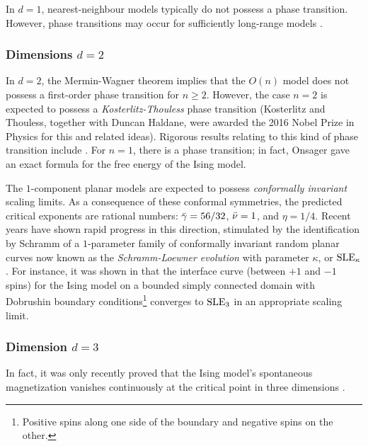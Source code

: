 In $d = 1$, nearest-neighbour models typically do not possess a phase transition.
However, phase transitions may occur for sufficiently long-range models \cite{Dyso69}.

\subsubsection{Dimensions $d = 2$}

In $d = 2$, the Mermin-Wagner theorem \cite{MW66} implies that the $O(n)$ model does
not possess a first-order phase transition for $n \ge 2$. However, the case $n = 2$
is expected to possess a \emph{Kosterlitz-Thouless} phase transition \cite{KT73}
(Kosterlitz and Thouless, together with Duncan Haldane, were awarded
the 2016 Nobel Prize in Physics for this and related ideas). Rigorous results relating
to this kind of phase transition include \cite{FS81,DH00,Falc12,Falc13}.
For $n = 1$, there is a phase transition; in fact, Onsager \cite{Onsager44} gave an
exact formula for the free energy of the Ising model.

The $1$-component planar models are expected to possess \emph{conformally invariant}
scaling limits. As a consequence of these conformal symmetries,
the predicted critical exponents are rational numbers: $\bar\gamma = 56/32$, $\bar\nu = 1$,
and $\eta = 1/4$. Recent years have shown rapid progress in this direction, stimulated
by the identification by Schramm \cite{Schramm00} of a $1$-parameter family of
conformally invariant random planar curves now known as the \emph{Schramm-Loewner
evolution} with parameter $\kappa$, or ${\rm SLE}_\kappa$. For instance, it was shown in
\cite{CDHKS14} that the interface curve (between $+ 1$ and $-1$ spins) for the Ising model
on a bounded simply connected domain with Dobrushin boundary
conditions\footnote{Positive spins along one side of the
boundary and negative spins on the other.} converges to ${\rm SLE}_3$ in
an appropriate scaling limit.

\subsubsection{Dimension $d=3$}

In fact, it was only recently proved
that the Ising model's spontaneous magnetization vanishes continuously at
the critical point in three dimensions \cite{ADS15}.

